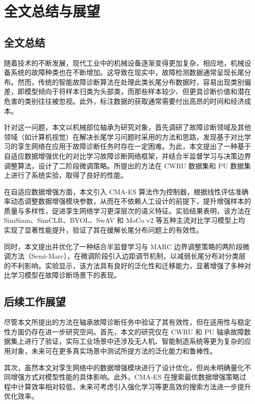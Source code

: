 \documentclass[master]{thesis-uestc}
\begin{document}
\chapter{全文总结与展望}

\section{全文总结}

随着技术的不断发展，现代工业中的机械设备逐渐变得更加复杂，相应地，机械设备系统的故障种类也在不断增加。这导致在现实中，故障检测数据通常呈现长尾分布。然而，传统的智能故障诊断算法在处理此类长尾分布数据时，容易出现类别偏差，即模型倾向于将样本归类为头部类，而那些样本较少、但更具诊断价值和潜在危害的类别往往被忽视。此外，标注数据的获取通常需要付出高昂的时间和经济成本。

针对这一问题，本文以机械部位轴承为研究对象，首先调研了故障诊断领域及其他领域（如计算机视觉）在解决长尾学习问题时采用的方法和思路，发现基于对比学习的孪生网络在应用于故障诊断任务时存在一定困难。为此，本文提出了一种基于自适应数据增强优化的对比学习故障诊断网络框架，并结合半监督学习与决策边界调整算法，设计了二阶段微调策略。所提出的方法在 CWRU 数据集和 PU 数据集上进行了系统实验，取得了良好的性能。

在自适应数据增强方面，本文引入 CMA-ES 算法作为控制器，根据线性评估准确率动态调整数据增强模块参数，从而在不依赖人工设计的前提下，提升增强样本的质量与多样性，促进孪生网络学习更深层次的语义特征。实验结果表明，该方法在 SimSiam、SimCLR、BYOL、SwAV 和 MoCo v2 等五种主流对比学习模型上均实现了显著性能提升，验证了其在缓解长尾分布问题上的有效性。

同时，本文提出并优化了一种结合半监督学习与 MARC 边界调整策略的两阶段微调方法（Semi-Marc），在微调阶段引入边距调节机制，以减弱长尾分布对分类层的不利影响。实验显示，该方法具有良好的泛化性和迁移能力，显著增强了多种对比学习模型在故障诊断场景下的表现。

\section{后续工作展望}

尽管本文所提出的方法在轴承故障诊断任务中验证了其有效性，但在适用性与稳定性方面仍存在进一步研究空间。首先，本文的研究仅在 CWRU 和 PU 轴承故障数据集上进行了验证，实际工业场景中还涉及无人机、智能制造系统等更为复杂的应用对象，未来可在更多真实场景中测试所提方法的泛化能力和鲁棒性。

其次，虽然本文对孪生网络中的数据增强模块进行了设计优化，但尚未明确量化不同增强方式对模型性能的具体影响。此外，CMA-ES 在搜索最优数据增强策略过程中计算效率相对较低，未来可考虑引入强化学习等更高效的搜索方法进一步提升优化效率。
\end{document}
